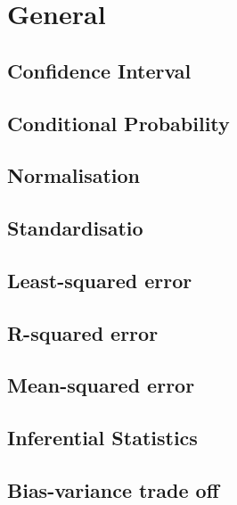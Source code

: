 \graphicspath{%
{chapter5graph/}%
{chapter5graph/bg/}}


\chapter{General}



\section{Confidence Interval}

\section{Conditional Probability}

\section{Normalisation}

\section{Standardisatio}

\section{Least-squared error}

\section{R-squared error}

\section{Mean-squared error}

\section{Inferential Statistics}

\section{Bias-variance trade off}



